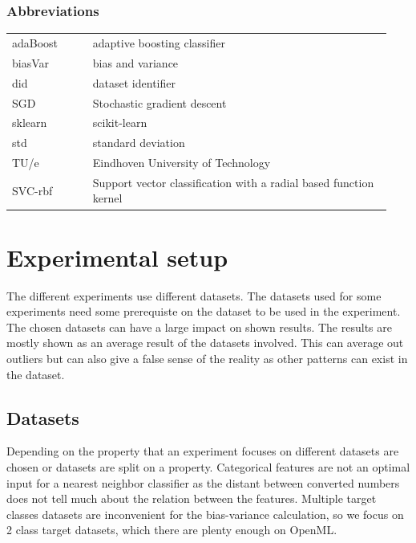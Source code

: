 \documentclass[a4paper,10pt]{article}
\begin{document}
\subsubsection{Abbreviations}
\begin{tabular}{ p{0.20\linewidth} p{0.7437\linewidth} }
	
	adaBoost & adaptive boosting classifier \\
	
	biasVar & bias and variance \\
	
	did & dataset identifier \\
	
	SGD & Stochastic gradient descent \\
	
	sklearn & scikit-learn \\
	
	std & standard deviation\\
	
	TU/e & Eindhoven University of Technology \\
	
	SVC-rbf & Support vector classification with a radial based function kernel
	
	
\end{tabular}

\newpage
\section{Experimental setup} \label{Chapter3}
The different experiments use different datasets. The datasets used for some experiments need some prerequiste on the dataset to be used in the experiment. The chosen datasets can have a large impact on shown results.
The results are mostly shown as an average result of the datasets involved. This can average out outliers but can also give a false sense of the reality as other patterns can exist in the dataset.


\subsection{Datasets} \label{description}
Depending on the property that an experiment focuses on different datasets are chosen or datasets are split on a property. Categorical features are not an optimal input for a nearest neighbor classifier as the distant between converted numbers does not tell much about the relation between the features. Multiple target classes datasets are inconvenient for the bias-variance calculation, so we focus on 2 class target datasets, which there are plenty enough on OpenML. 
\end{document}
